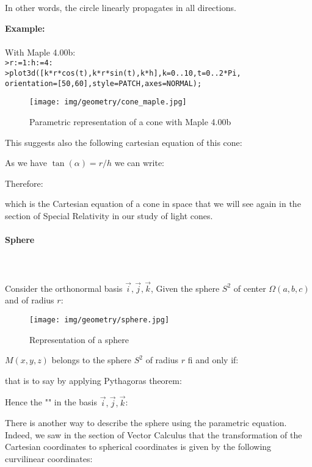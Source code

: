 {	In other words, the circle linearly propagates in all directions.
	\begin{tcolorbox}[colframe=black,colback=white,sharp corners]
	\textbf{{\Large {}}Example:}\\\\
	With Maple 4.00b:\\

	\texttt{>r:=1:h:=4:\\
	>plot3d([k*r*cos(t),k*r*sin(t),k*h],k=0..10,t=0..2*Pi,\\
	orientation=[50,60],style=PATCH,axes=NORMAL);
	}
	\begin{figure}[H]
		\centering
		\texttt{[image: img/geometry/cone\_maple.jpg]}
		\caption{Parametric representation of a cone with Maple 4.00b}
	\end{figure}
	\end{tcolorbox}
	This suggests also the following cartesian equation of this cone:
	
	As we have $\tan(\alpha)=r/h$ we can write:
	
	Therefore:
	
	which is the Cartesian equation of a cone in space that we will see again in the section of Special Relativity in our study of light cones.
	
	\paragraph{Sphere}\label{sphere}\mbox{}\\\\
	Consider the orthonormal basis ${\vec{i},\vec{j},\vec{k}}$, Given the sphere $S^2$ of  center $\Omega(a,b,c)$ and of radius $r$:
	\begin{figure}[H]
		\centering
		\texttt{[image: img/geometry/sphere.jpg]}
		\caption{Representation of a sphere}
	\end{figure}
	$M(x,y,z)$ belongs to the sphere  $S^2$ of radius $r$ fi and only if:
	
	that is to say by applying Pythagoras theorem:
	
	Hence the "" in the basis ${\vec{i},\vec{j},\vec{k}}$:
	
	There is another way to describe the sphere using the parametric equation. Indeed, we saw in the section of Vector Calculus that the transformation of the Cartesian coordinates to spherical coordinates is given by the following curvilinear coordinates:
	
}
